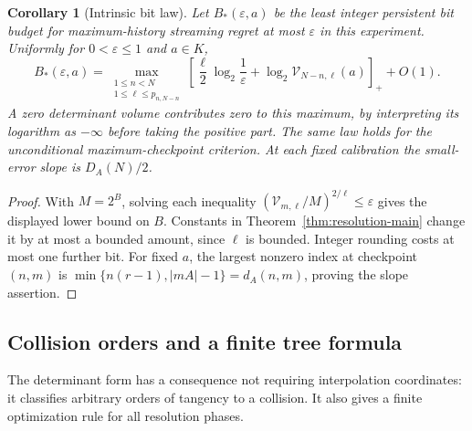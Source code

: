 \documentclass[11pt]{amsart}
\newtheorem{corollary}[theorem]{Corollary}
\theoremstyle{definition}\newtheorem{definition}[theorem]{Definition}
\theoremstyle{remark}\newtheorem{remark}[theorem]{Remark}
\begin{document}
\begin{corollary}[Intrinsic bit law]\label{cor:intrinsic-bits}
Let $B_*(\varepsilon,a)$ be the least integer persistent bit budget
for maximum-history streaming regret at most $\varepsilon$ in this
experiment. Uniformly for $0<\varepsilon\le1$ and $a\in K$,
\begin{equation}\label{eq:intrinsic-bits}
 B_*(\varepsilon,a)=
 \max_{\substack{1\le n<N\\1\le\ell\le p_{n,N-n}}}
 \left[\frac{\ell}{2}\log_2\frac1\varepsilon+
       \log_2\mathcal V_{N-n,\ell}(a)\right]_++O(1).
\end{equation}
A zero determinant volume contributes zero to this maximum, by interpreting
its logarithm as $-\infty$ before taking the positive part. The same law
holds for the unconditional maximum-checkpoint criterion. At each fixed
calibration the small-error slope is $D_A(N)/2$.
\end{corollary}
\begin{proof}
With $M=2^B$, solving each inequality
$(\mathcal V_{m,\ell}/M)^{2/\ell}\le\varepsilon$ gives the displayed
lower bound on $B$. Constants in Theorem~\ref{thm:resolution-main} change
it by at most a bounded amount, since $\ell$ is bounded. Integer rounding
costs at most one further bit. For fixed $a$, the largest nonzero index
at checkpoint $(n,m)$ is
$\min\{n(r-1),|mA|-1\}=d_A(n,m)$, proving the slope assertion.
\end{proof}

\subsection{Collision orders and a finite tree formula}
The determinant form has a consequence not requiring interpolation
coordinates: it classifies arbitrary orders of tangency to a collision.
It also gives a finite optimization rule for all resolution phases.
\end{document}
